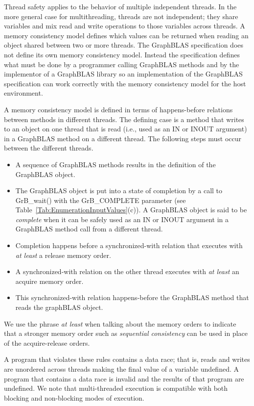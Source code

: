 Thread safety applies to the behavior of multiple independent threads.  In the 
more general case for multithreading, threads are not independent; they share 
variables and mix read and write operations to those variables across threads.  
A memory consistency model defines which values can be returned when reading an 
object shared between two or more threads.  The GraphBLAS specification does not 
define its own memory consistency model. Instead the specification defines what 
must be done by a programmer calling GraphBLAS methods and by the implementor of 
a GraphBLAS library so an implementation of the GraphBLAS specification can work 
correctly with the memory consistency model for the host environment. 

A memory consistency model is defined in terms of happens-before relations between 
methods in different threads.  The defining case is a method that writes to an 
object on one thread that is read (i.e., used as an IN or INOUT argument) in a 
GraphBLAS method on a different thread.  The following steps must occur 
between the different threads.
\begin{itemize}
\item A sequence of GraphBLAS methods results in the definition of the GraphBLAS object.
\item The GraphBLAS object is put into a state of completion by a call to {\sf GrB\_wait()} 
with the {\sf GrB\_COMPLETE} parameter (see Table~\ref{Tab:EnumerationInputValues}(c)).  
A GraphBLAS object is said to be \emph{complete} when it can be safely used as an 
{\sf IN} or {\sf INOUT} argument in a GraphBLAS method call from a different thread. 
\item Completion happens before a synchronized-with relation that executes 
with \emph{at least} a release memory order.
\item A synchronized-with relation on the other thread executes with \emph{at 
least} an acquire memory order.
\item This synchronized-with relation happens-before the GraphBLAS method that 
reads the graphBLAS object.
\end{itemize}
We use the phrase \emph{at least} when talking about the memory orders to 
indicate that a stronger memory order such as \emph{sequential consistency} can 
be used in place of the acquire-release orders.

A program that violates these rules contains a data race; that is, reads and writes are 
unordered across threads making the final value of a variable undefined.  A program that 
contains a data race is invalid and the results of that program are undefined.  
We note that multi-threaded execution is compatible with both blocking and non-blocking
modes of execution. 

